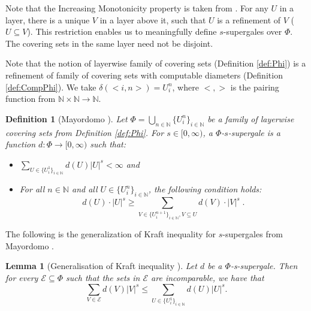 \documentclass[11pt]{article}
\newtheorem{lemma}{Lemma}
\newtheorem{definition}{Definition}
\newcommand{\N}{\mathbb{N}}
\newcommand{\Rplus}{[0,\infty)}
\newcommand{\U}{U}
\newcommand{\defPhi}{\bigcup_{n \in \N}\{U_i^n\}_{i \in
		\N}}
\begin{document}
Note that the Increasing Monotonicity property is taken from \cite{Mayordomo2018}. For any $U$ in a layer, there is a unique $V$ in a layer above it, such that $U$ is a refinement of $V$ ($U \subseteq V$). 
This restriction enables us to meaningfully define $s$-supergales over $\Phi$. The covering sets in the same layer need not be disjoint. 
 
Note that the notion of layerwise family of covering sets (Definition \ref{def:Phi}) is a refinement of family of  covering sets with computable diameters (Definition \ref{def:CompPhi}). We take $\delta(<i,n>) = U_i^n$, where $<,>$ is the pairing function from $\N \times \N \to \N$. 

\begin{definition}[Mayordomo \cite{Mayordomo2018}] \label{def:superGale} 
	Let $\Phi = \defPhi$ be a family of layerwise covering sets from
	Definition \ref{def:Phi}. For $s \in \Rplus$, a $\Phi$-$s$-supergale
	is a function $d: \Phi \to \Rplus$ such that: 
	
	\begin{itemize}
		\item $\sum\limits_{U \in \{U_i^1\}_{i \in \N}} d(U) |U|^s < \infty$ and
		\item For all $n \in \N$ and all $\U \in \{\U_i^n\}_{i \in \N}$, the
		following condition holds:
		$$ d(\U)\cdot |\U|^s \geq \sum_{V \in  \{\U_i^{n+1}\}_{i \in \N}, V \subseteq U}  d(V) \cdot |V|^s\;.$$
	\end{itemize}
\end{definition}	

The following is the generalization of Kraft inequality for $s$-supergales from Mayordomo \cite{Mayordomo2018}.
\begin{lemma} [Generalisation of Kraft inequality \cite{Mayordomo2018}] \label{lem:kolmogorovInequality}
	Let $d$ be a $\Phi$-s-supergale. Then for every $\mathcal{E} \subseteq \Phi$ such that the sets in $\mathcal{E}$ are incomparable, we have that
	$$ \sum\limits_{V \in \mathcal{E}} d(V) |V|^s \leq \sum\limits_{U \in \{U_i^1\}_{i \in \N}} d(U) |U|^s.$$  
\end{lemma}
\end{document}
